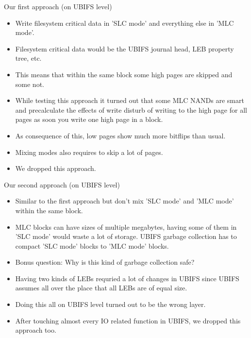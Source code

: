 \documentclass[aspectratio=169,obeyspaces,spaces,hyphens,dvipsnames]{beamer}
\begin{document}
\begin{frame}{Our first approach (on UBIFS level)}
  \begin{itemize}
  \item Write filesystem critical data in 'SLC mode' and everything else in 'MLC mode'.
  \item Filesystem critical data would be the UBIFS journal head, LEB property tree, etc.
  \item This means that within the same block some high pages are skipped and some not.
  \item While testing this approach it turned out that some MLC NANDs are smart and
        precalculate the effects of write disturb of writing to the high page for all
        pages as soon you write one high page in a block.
  \item As consequence of this, low pages show much more bitflips than usual.
  \item Mixing modes also requires to skip a lot of pages.
  \item We dropped this approach.
  \end{itemize}
\end{frame}

\begin{frame}{Our second approach (on UBIFS level)}
  \begin{itemize}
  \item Similar to the first approach but don't mix 'SLC mode' and 'MLC mode' within the same
        block.
  \item MLC blocks can have sizes of multiple megabytes, having some of them in 'SLC mode' would
        waste a lot of storage. UBIFS garbage collection has to compact 'SLC mode' blocks to 'MLC mode'
        blocks.
  \item Bonus question: Why is this kind of garbage collection safe?
  \item Having two kinds of LEBs requried a lot of changes in UBIFS since UBIFS assumes all over the
        place that all LEBs are of equal size.
  \item Doing this all on UBIFS level turned out to be the wrong layer.
  \item After touching almost every IO related function in UBIFS, we dropped this approach too.
  \end{itemize}
\end{frame}
\end{document}
